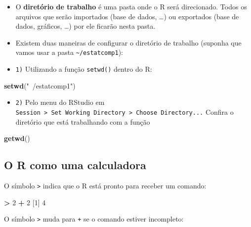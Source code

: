 \documentclass[10pt,a4paper]{book}
\newenvironment{Shaded}{\begin{snugshade}}{\end{snugshade}}
\newcommand{\KeywordTok}[1]{\textcolor[rgb]{0.13,0.29,0.53}{\textbf{#1}}}
\newcommand{\DecValTok}[1]{\textcolor[rgb]{0.00,0.00,0.81}{#1}}
\newcommand{\StringTok}[1]{\textcolor[rgb]{0.31,0.60,0.02}{#1}}
\newcommand{\OperatorTok}[1]{\textcolor[rgb]{0.81,0.36,0.00}{\textbf{#1}}}
\newcommand{\NormalTok}[1]{#1}
\providecommand{\tightlist}{%
  \setlength{\itemsep}{0pt}\setlength{\parskip}{0pt}}
\begin{document}
\begin{itemize}
\item
  O \textbf{diretório de trabalho} é uma pasta onde o R será
  direcionado. Todos os arquivos que serão importados (base de dados,
  \ldots{}) ou exportados (base de dados, gráficos, \ldots{}) por ele
  ficarão nesta pasta.
\item
  Existem duas maneiras de configurar o diretório de trabalho (suponha
  que vamos usar a pasta \texttt{\textasciitilde{}/estatcomp1}):
\item
  \texttt{1)} Utilizando a função \texttt{setwd()} dentro do R:
\end{itemize}

\begin{Shaded}
\begin{Highlighting}[]
\KeywordTok{setwd}\NormalTok{(}\StringTok{"~/estatcomp1"}\NormalTok{)}
\end{Highlighting}
\end{Shaded}

\begin{itemize}
\tightlist
\item
  \texttt{2)} Pelo menu do RStudio em
  \texttt{Session\ \textgreater{}\ Set\ Working\ Directory\ \textgreater{}\ Choose\ Directory...}
  Confira o diretório que está trabalhando com a função
\end{itemize}

\begin{Shaded}
\begin{Highlighting}[]
\KeywordTok{getwd}\NormalTok{()}
\end{Highlighting}
\end{Shaded}

\subsection{O R como uma calculadora}\label{o-r-como-uma-calculadora}

O símbolo \texttt{\textgreater{}} indica que o R está pronto para
receber um comando:

\begin{Shaded}
\begin{Highlighting}[]
\OperatorTok{>}\StringTok{ }\DecValTok{2} \OperatorTok{+}\StringTok{ }\DecValTok{2}
\NormalTok{[}\DecValTok{1}\NormalTok{] }\DecValTok{4}
\end{Highlighting}
\end{Shaded}

O símbolo \texttt{\textgreater{}} muda para \texttt{+} se o comando
estiver incompleto:
\end{document}
